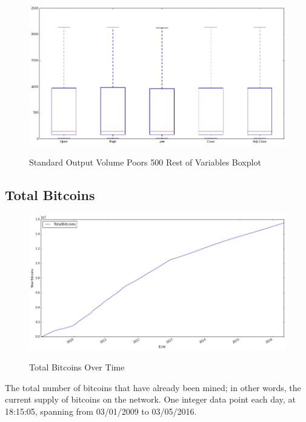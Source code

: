\begin{figure}[bth]
  \myfloatalign
  {\includegraphics[width=1\linewidth]
    {gfx/standard-and-poors-500-rest-boxplot}}
  \caption{Standard Output Volume Poors 500
    Rest of Variables Boxplot}
  \label{fig:standard-and-poors-500-rest-boxplot}
\end{figure}

\clearpage

\subsection{Total Bitcoins}
\label{sec:total-bitcoins}

\begin{figure}[bth]
  \myfloatalign
  {\includegraphics[width=1\linewidth]
    {gfx/total-bitcoins-over-time}}
  \caption{Total Bitcoins
    Over Time}
  \label{fig:total-bitcoins-over-time}
\end{figure}

The total number of bitcoins that have already been mined; in other
words, the current supply of bitcoins on the network. One integer data
point each day, at 18:15:05, spanning from 03/01/2009 to 03/05/2016.

